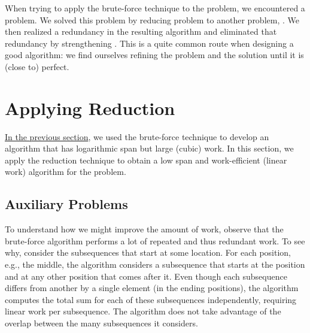 \begin{cluster}
\label{grp:grm:mcss::summary}

\begin{gram}[Summary]
\label{grm:mcss::summary}
  When trying to apply the brute-force technique to the \MCSS{} problem,
  we encountered a problem.  We solved this problem by reducing \MCSS{}
  problem to another problem, \MCS{}. We then realized a redundancy in
  the resulting algorithm and eliminated that redundancy by
  strengthening \MCS{}.  This is a quite common route when designing a
  good algorithm: we find ourselves refining the problem and the
  solution until it is (close to) perfect.

\end{gram}
\end{cluster}


\section{Applying Reduction}
\label{sec:mcss::reduction}

\begin{cluster}
\label{grp:grm:mcss::mcss}

\begin{gram}
\label{grm:mcss::mcss}
\href{sec:mcss::bf}{In the previous section}, we used the brute-force
technique to develop an algorithm that has logarithmic span but large
(cubic) work.
In this section, we apply the reduction technique to obtain a
low span and work-efficient (linear work) algorithm for the \MCSS{}
problem.

\end{gram}
\end{cluster}


\subsection{Auxiliary Problems}
\label{sec:mcss::auxiliary-problems}

\begin{cluster}
\label{grp:grm:mcss::overlapping-subsequences-and-redundancy}

\begin{gram}
\label{grm:mcss::overlapping-subsequences-and-redundancy}
To understand how we might improve the amount of work, observe that
the brute-force algorithm performs a lot of repeated and thus redundant work.
To see why, consider the subsequences that start at some location.
For each position, e.g., the middle, the algorithm considers a
subsequence that starts at the position and at any other position that
comes after it.
Even though each subsequence differs from another by a single element
(in the ending positions), the algorithm computes the total sum for
each of these subsequences independently, requiring linear work per
subsequence.
The algorithm does not take advantage of the overlap between the many subsequences it considers.

\end{gram}
\end{cluster}

